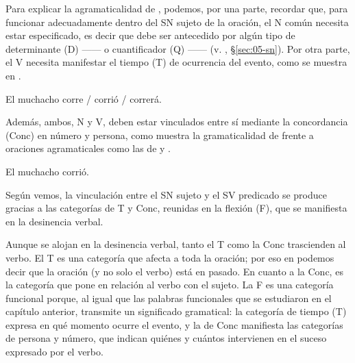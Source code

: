 Para explicar la agramaticalidad de , podemos, por una
parte, recordar que, para funcionar adecuadamente dentro del SN sujeto de la
oración, el N común necesita estar especificado, es decir que debe ser
antecedido por algún tipo de determinante (D) ------ o cuantificador (Q) ------
(v. , §\ref{sec:05-sn}). Por otra parte, el V necesita manifestar el
tiempo (T) de ocurrencia del evento, como se muestra en .

\begin{exe}
  \ex\label{ex:06-corre} El muchacho corre / corrió / correrá.
\end{exe}

Además, ambos, N y V, deben estar vinculados entre sí mediante la concordancia
(Conc) en número y persona, como muestra la gramaticalidad de
 frente a oraciones agramaticales como las de
 y .

\begin{exe}
  \ex\label{ex:06-conc}
    \begin{xlist}
      \ex\label{ex:06-conc-a} El muchacho corrió.
    \end{xlist}
\end{exe}

\begin{destacado}
Según vemos, la vinculación entre el SN sujeto y el SV predicado se produce
gracias a las categorías de T y Conc, reunidas en la flexión (F), que se
manifiesta en la desinencia verbal.
\end{destacado}

Aunque se alojan en la desinencia verbal, tanto el T como la Conc trascienden al
verbo. El T es una categoría que afecta a toda la oración; por eso en
 podemos decir que la oración (y no solo el verbo) está en
pasado. En cuanto a la Conc, es la
categoría que pone en relación al verbo con el sujeto. La F es una categoría
funcional porque, al igual que las palabras funcionales que se estudiaron en el
capítulo anterior, transmite un significado gramatical: la categoría de tiempo
(T) expresa en qué momento ocurre el evento, y la de Conc manifiesta las
categorías de persona y número, que indican quiénes y cuántos intervienen en el
suceso expresado por el verbo.

